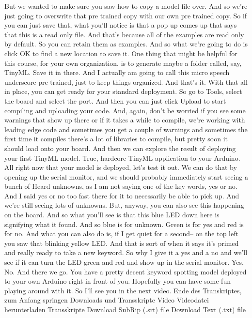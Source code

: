     But we wanted to make sure you saw how to copy a model file over.
    And so we're just going to overwrite that pre trained copy with our own pre
    trained copy.
    So if you can just save that, what you'll notice
    is that a pop up comes up that says that this is a read only file.
    And that's because all of the examples are read only by default.
    So you can retain them as examples.
    And so what we're going to do is click OK to find a new location to save it.
    One thing that might be helpful for this course, for your own organization,
    is to generate maybe a folder called, say, TinyML.
    Save it in there.
    And I actually am going to call this micro speech underscore pre
    trained, just to keep things organized.
    And that's it.
    With that all in place, you can get ready for your standard deployment.
    So go to Tools, select the board and select the port.
    And then you can just click Upload to start compiling and uploading
    your code.
    And, again, don't be worried if you see some warnings that show up there
    or if it takes a while to compile, we're working with leading edge code
    and sometimes you get a couple of warnings
    and sometimes the first time it compiles there's a lot of libraries to compile,
    but pretty soon it should load onto your board.
    And then we can explore the result of deploying your first TinyML model.
    True, hardcore TinyML application to your Arduino.
    All right now that your model is deployed, let's test it out.
    We can do that by opening up the serial monitor,
    and we should probably immediately start seeing a bunch of Heard unknowns,
    as I am not saying one of the key words, yes or no.
    And I said yes or no too fast there for it to necessarily be able to pick up.
    And we're still seeing lots of unknowns.
    But, anyway, you can also see this happening on the board.
    And so what you'll see is that this blue LED down here
    is signifying what it found.
    And so blue is for unknown.
    Green is for yes and red is for no.
    And what you can also do is, if I get quiet for a second--
    on the top left you saw that blinking yellow LED.
    And that is sort of when it says it's primed
    and really ready to take a new keyword.
    So why I give it a yes and a no and we'll
    see if it can turn the LED green and red and show up in the serial monitor.
    Yes.
    No.
    And there we go.
    You have a pretty decent keyword spotting
    model deployed to your own Arduino right in front of you.
    Hopefully you can have some fun playing around with it.
    So I'll see you in the next video.
    Ende des Transkriptes, zum Anfang springen
    Downloads und Transskripte
    Video
    Videodatei herunterladen
    Transskripte
    Download SubRip (.srt) file
    Download Text (.txt) file
    
